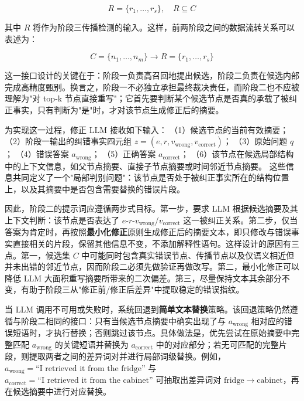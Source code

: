 \begin{equation}
R = \{r_1, \ldots, r_s\}, \quad R \subseteq C
\end{equation}

其中 $R$ 将作为阶段三传播检测的输入。这样，前两阶段之间的数据流转关系可以表述为：

\begin{equation}
C = \{n_1, \ldots, n_m\} \rightarrow R = \{r_1, \ldots, r_s\}
\end{equation}

这一接口设计的关键在于：阶段一负责高召回地提出候选，阶段二负责在候选内部完成高精度甄别。换言之，阶段一不必独立承担最终裁决责任，而阶段二也不应被理解为"对 top-k 节点直接重写"；它首先要判断某个候选节点是否真的承载了被纠正事实，只有判断为"是"时，才对该节点生成修正后的摘要。

为实现这一过程，修正 LLM 接收如下输入：
（1）候选节点的当前有效摘要；
（2）阶段一输出的纠错事实四元组 $z=(e,r,v_{\mathrm{wrong}},v_{\mathrm{correct}})$；
（3）原始问题 $q$；
（4）错误答案 $a_{\mathrm{wrong}}$；
（5）正确答案 $a_{\mathrm{correct}}$；
（6）该节点在候选局部结构中的上下文信息，如父节点摘要、直接子节点摘要或时间邻近节点摘要。
这些信息共同定义了一个"局部判别问题"：该节点是否处于被纠正事实所在的结构位置上，以及其摘要中是否包含需要替换的错误片段。

因此，阶段二的提示词应遵循两步式目标。第一步，要求 LLM 根据候选摘要及其上下文判断：该节点是否表达了 $e$-$r$-$v_{\mathrm{wrong}}$/$v_{\mathrm{correct}}$ 这一被纠正关系。第二步，仅当答案为肯定时，再按照\textbf{最小化修正}原则生成修正后的摘要文本，即只修改与错误事实直接相关的片段，保留其他信息不变，不添加解释性语句。这样设计的原因有三点。第一，候选集 $C$ 中可能同时包含真实错误节点、传播节点以及仅语义相近但并未出错的邻近节点，因而阶段二必须先做验证再做改写。第二，最小化修正可以降低 LLM 大面积重写摘要所带来的二次偏差。第三，尽量保持文本其余部分不变，有助于阶段三从"修正前/修正后差异"中提取稳定的错误指纹。

当 LLM 调用不可用或失败时，系统回退到\textbf{简单文本替换}策略。该回退策略仍然遵循与阶段二相同的接口：只有当候选节点摘要中确实出现了与 $a_{\mathrm{wrong}}$ 相对应的错误短语时，才执行替换；否则跳过该节点。具体做法是，优先尝试在原始摘要中完整匹配 $a_{\mathrm{wrong}}$ 的关键短语并替换为 $a_{\mathrm{correct}}$ 中的对应部分；若无可匹配的完整片段，则提取两者之间的差异词对并进行局部词级替换。例如，$a_{\mathrm{wrong}} = \text{``I retrieved it from the fridge''}$ 与 $a_{\mathrm{correct}} = \text{``I retrieved it from the cabinet''}$ 可抽取出差异词对 $\mathrm{fridge} \rightarrow \mathrm{cabinet}$，再在候选摘要中进行对应替换。

